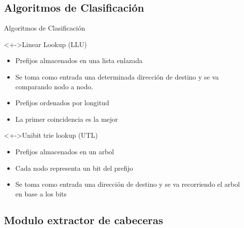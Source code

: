 \documentclass[xcolor=dvipsnames]{beamer}
\begin{document}
\subsection{Algoritmos de Clasificación}
\begin{frame}{Algoritmos de Clasificación}
\begin{block}<+->{Linear Lookup (LLU)}   
    \begin{itemize}
      \scriptsize
     	\item Prefijos almacenados en una lista enlazada
	\item Se toma como entrada una determinada dirección de destino y se va comparando nodo a nodo.
	\item Prefijos ordenados por longitud
	\item La primer coincidencia es la mejor
    \end{itemize}
  \end{block}
  \begin{block}<+->{Unibit trie lookup (UTL)}   
    \begin{itemize}
      \scriptsize
     	\item Prefijos almacenados en un arbol
	\item Cada nodo representa un bit del prefijo
	\item Se toma como entrada una dirección de destino y se va recorriendo el arbol en base a los bits
    \end{itemize}
  \end{block}
\end{frame}

\subsection{Modulo extractor de cabeceras}
\end{document}
